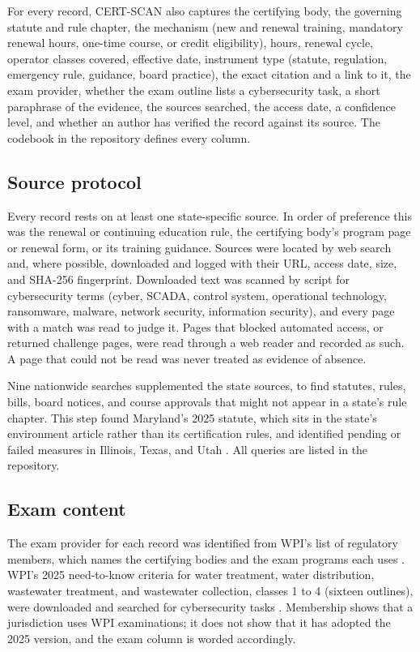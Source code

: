 \documentclass[10pt,twocolumn,letterpaper]{article}
\begin{document}
For every record, CERT-SCAN also captures the certifying body, the governing statute and rule chapter, the mechanism (new and renewal training, mandatory renewal hours, one-time course, or credit eligibility), hours, renewal cycle, operator classes covered, effective date, instrument type (statute, regulation, emergency rule, guidance, board practice), the exact citation and a link to it, the exam provider, whether the exam outline lists a cybersecurity task, a short paraphrase of the evidence, the sources searched, the access date, a confidence level, and whether an author has verified the record against its source. The codebook in the repository defines every column.

\subsection{Source protocol}

Every record rests on at least one state-specific source. In order of preference this was the renewal or continuing education rule, the certifying body's program page or renewal form, or its training guidance. Sources were located by web search and, where possible, downloaded and logged with their URL, access date, size, and SHA-256 fingerprint. Downloaded text was scanned by script for cybersecurity terms (cyber, SCADA, control system, operational technology, ransomware, malware, network security, information security), and every page with a match was read to judge it. Pages that blocked automated access, or returned challenge pages, were read through a web reader and recorded as such. A page that could not be read was never treated as evidence of absence.

Nine nationwide searches supplemented the state sources, to find statutes, rules, bills, board notices, and course approvals that might not appear in a state's rule chapter. This step found Maryland's 2025 statute, which sits in the state's environment article rather than its certification rules, and identified pending or failed measures in Illinois, Texas, and Utah \cite{bondbuyer,txsb1034,utah}. All queries are listed in the repository.

\subsection{Exam content}

The exam provider for each record was identified from WPI's list of regulatory members, which names the certifying bodies and the exam programs each uses \cite{wpimembers}. WPI's 2025 need-to-know criteria for water treatment, water distribution, wastewater treatment, and wastewater collection, classes 1 to 4 (sixteen outlines), were downloaded and searched for cybersecurity tasks \cite{wpintk}. Membership shows that a jurisdiction uses WPI examinations; it does not show that it has adopted the 2025 version, and the exam column is worded accordingly.
\end{document}

